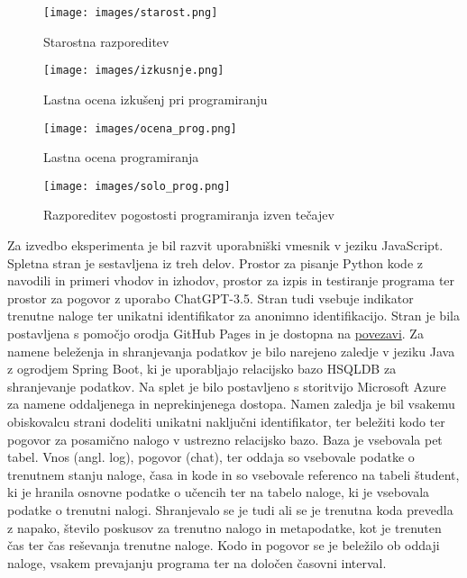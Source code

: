\documentclass[a4paper,12pt,openright]{book}
\begin{document}
\begin{figure}[H]
    \centering
    \texttt{[image: images/starost.png]}
    \caption{Starostna razporeditev}
    \label{fig:ages}
\end{figure}

\begin{figure}[H]
    \centering
    \texttt{[image: images/izkusnje.png]}
    \caption{Lastna ocena izkušenj pri programiranju}
    \label{fig:ages}
\end{figure}

\begin{figure}[H]
    \centering
    \texttt{[image: images/ocena\_prog.png]}
    \caption{Lastna ocena programiranja}
    \label{fig:ocena_prog}
\end{figure}

\begin{figure}[H]
    \centering
    \texttt{[image: images/solo\_prog.png]}
    \caption{Razporeditev pogostosti programiranja izven tečajev}
    \label{fig:solo_prog}
\end{figure}



Za izvedbo eksperimenta je bil razvit uporabniški vmesnik v jeziku JavaScript. Spletna stran je sestavljena iz treh delov. Prostor za pisanje Python kode z navodili in primeri vhodov in izhodov, prostor za izpis in testiranje programa ter prostor za pogovor z uporabo ChatGPT-3.5. Stran tudi vsebuje indikator trenutne naloge ter unikatni identifikator za anonimno identifikacijo. Stran je bila postavljena s pomočjo orodja GitHub Pages in je dostopna na \href{https://spin311.github.io/diploma/}{povezavi}.
Za namene beleženja in shranjevanja podatkov je bilo narejeno zaledje v jeziku Java z ogrodjem Spring Boot, ki je uporabljajo relacijsko bazo HSQLDB za shranjevanje podatkov. Na splet je bilo postavljeno s storitvijo Microsoft Azure za namene oddaljenega in neprekinjenega dostopa. Namen zaledja je bil vsakemu obiskovalcu strani dodeliti unikatni naključni identifikator, ter beležiti kodo ter pogovor za posamično nalogo v ustrezno relacijsko bazo. Baza je vsebovala pet tabel. Vnos (angl. log), pogovor (chat), ter oddaja so vsebovale podatke o trenutnem stanju naloge, časa in kode in so vsebovale referenco na tabeli študent, ki je hranila osnovne podatke o učencih ter na tabelo naloge, ki je vsebovala podatke o trenutni nalogi. Shranjevalo se je tudi ali se je trenutna koda prevedla z napako, število poskusov za trenutno nalogo in metapodatke, kot je trenuten čas ter čas reševanja trenutne naloge. Kodo in pogovor se je beležilo ob oddaji naloge, vsakem prevajanju programa ter na določen časovni interval.
\end{document}
